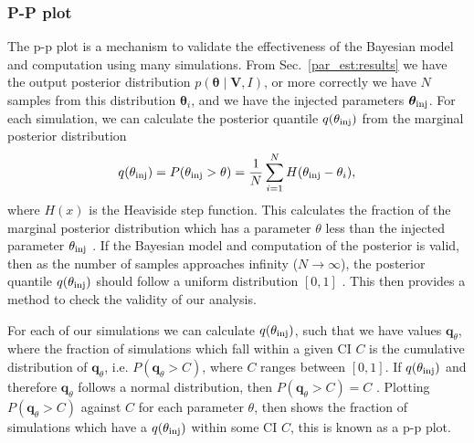 \subsubsection{\label{par_est:results:simulations:ppplot}P-P plot}

The p-p plot is a mechanism to validate the effectiveness of the Bayesian model and computation using many simulations.
From Sec.~\ref{par_est:results} we have the output posterior distribution $p(\bm{\theta} \mid \bm{V}, I)$, or more correctly we have $N$ samples from this distribution $\bm{\theta}_i$, and we have the injected parameters $\bm{\theta}_{\rm{inj}}$.
For each simulation, we can calculate the posterior quantile $q(\theta_{\rm{inj}})$ from the marginal posterior distribution
\begin{equation}
    q(\theta_{\rm{inj}}) = P(\theta_{\rm{inj}} > \theta) = \frac{1}{N} \sum_{i=1}^{N} H(\theta_{\rm{inj}} - \theta_i),
\end{equation}
where $H(x)$ is the Heaviside step function. 
This calculates the fraction of the marginal posterior distribution which has a parameter $\theta$ less than the injected parameter $\theta_{\rm{inj}}$ \citep{cook2006ValidationSoftware}.
If the Bayesian model and computation of the posterior is valid, then as the number of samples approaches infinity ($N \rightarrow \infty$), the posterior quantile $q(\theta_{\rm{inj}})$ should follow a uniform distribution $[0,1]$ \citep{cook2006ValidationSoftware}.
This then provides a method to check the validity of our analysis.

For each of our simulations we can calculate $q(\theta_{\rm{inj}})$, such that we have values $\bm{q}_{\theta}$, where the fraction of simulations which fall within a given \gls{CI} $C$ is the cumulative distribution of $\bm{q}_{\theta}$, i.e. $P(\bm{q}_{\theta} > C)$, where $C$ ranges between $[0,1]$.
If $q(\theta_{\rm{inj}})$ and therefore $\bm{q}_{\theta}$ follows a normal distribution, then $P(\bm{q}_{\theta} > C) = C$ \citep{cook2006ValidationSoftware}.
Plotting $P(\bm{q}_{\theta} > C)$ against $C$ for each parameter $\theta$, then shows the fraction of simulations which have a $q(\theta_{\rm{inj}})$ within some \gls{CI} $C$, this is known as a p-p plot.


